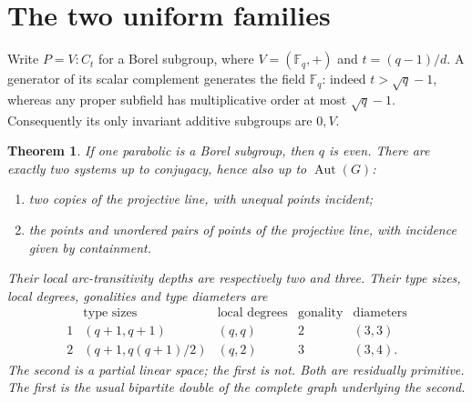 \documentclass[11pt,a4paper]{article}
\newtheorem{theorem}{Theorem}\newtheorem{lemma}[theorem]{Lemma}
\newcommand{\Aut}{\operatorname{Aut}}\newcommand{\F}{\mathbb F}
\begin{document}
\section{The two uniform families}
Write $P=V:C_t$ for a Borel subgroup, where $V=(\F_q,+)$ and
$t=(q-1)/d$. A generator of its scalar complement generates the field
$\F_q$: indeed $t>\sqrt q-1$, whereas any proper subfield has multiplicative
order at most $\sqrt q-1$. Consequently its only invariant additive
subgroups are $0,V$.

\begin{theorem}\label{borel}
If one parabolic is a Borel subgroup, then $q$ is even. There are exactly
two systems up to conjugacy, hence also up to $\Aut(G)$:
\begin{enumerate}
\item two copies of the projective line, with unequal points incident;
\item the points and unordered pairs of points of the projective line,
with incidence given by containment.
\end{enumerate}
Their local arc-transitivity depths are respectively two and three.
Their type sizes, local degrees, gonalities and type diameters are
\[
\begin{array}{c|c|c|c|c}
 &\text{type sizes}&\text{local degrees}&\text{gonality}&\text{diameters}\\\hline
1&(q+1,q+1)&(q,q)&2&(3,3)\\
2&(q+1,q(q+1)/2)&(q,2)&3&(3,4).
\end{array}
\]
The second is a partial linear space; the first is not. Both are residually
primitive. The first is the usual bipartite double of the complete graph
underlying the second.
\end{theorem}
\end{document}

